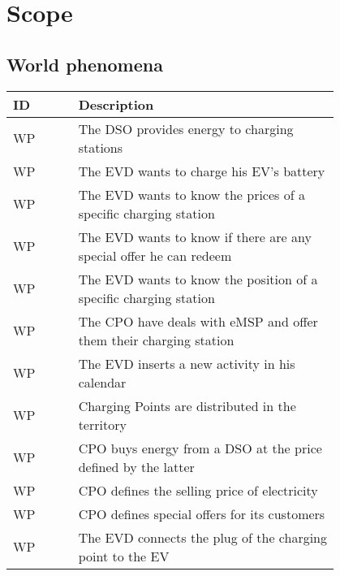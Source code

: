 \section{Scope}
\label{sec:scope}

\subsection{World phenomena}
\label{subsec:world_phenomena}%
\setcounter{wp}{1}
\newcommand{\cwp}{\thewp\stepcounter{wp}}
\begin{center}
    \begin{longtable}{ |l|p{0.8\linewidth}| }
        \hline
        \textbf{ID} & \textbf{Description}                                               \\
        \hline
        WP\cwp      & The DSO provides energy to charging stations                       \\
        \hline
        WP\cwp      & The EVD wants to charge his EV's battery                           \\
        \hline
        WP\cwp      & The EVD wants to know the prices of a specific charging station    \\
        \hline
        WP\cwp      & The EVD wants to know if there are any special offer he can redeem \\
        \hline
        WP\cwp      & The EVD wants to know the position of a specific charging station  \\
        \hline
        WP\cwp      & The CPO have deals with eMSP and offer them their charging station \\
        \hline
        WP\cwp      & The EVD inserts a new activity in his calendar                     \\
        \hline
        WP\cwp      & Charging Points are distributed in the territory                   \\
        \hline
        WP\cwp      & CPO buys energy from a DSO at the price defined by the latter      \\
        \hline
        WP\cwp      & CPO defines the selling price of electricity                       \\
        \hline
        WP\cwp      & CPO defines special offers for its customers                       \\
        \hline
        WP\cwp      & The EVD connects the plug of the charging point to the EV          \\
        \hline

\end{longtable}
\end{center}
